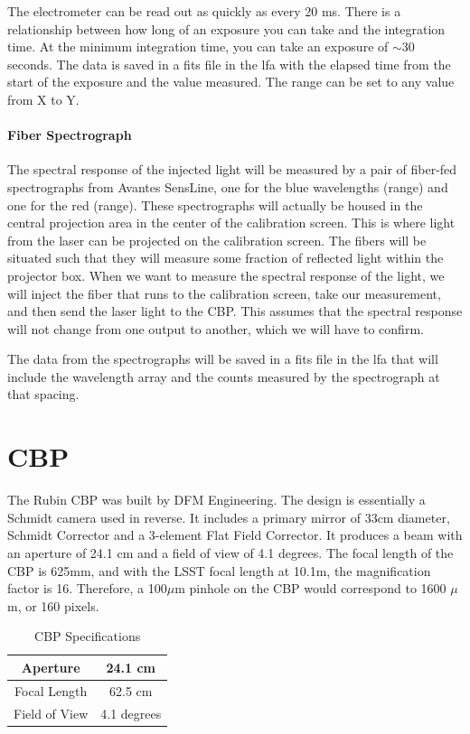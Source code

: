 \documentclass[SE,authoryear,toc]{article}
\begin{document}
\begin{table}[|||]
The electrometer can be read out as quickly as every 20 ms. There is a relationship between how long of an exposure you can take and the integration time. At the minimum integration time, you can take an exposure of $\sim$30 seconds. The data is saved in a fits file in the lfa with the elapsed time from the start of the exposure and the value measured. The range can be set to any value from X to Y. 

\paragraph{\textbf{Fiber Spectrograph}}

The spectral response of the injected light will be measured by a pair of fiber-fed spectrographs from Avantes SensLine, one for the blue wavelengths (range) and one for the red (range). These spectrographs will actually be housed in the central projection area in the center of the calibration screen. This is where light from the laser can be projected on the calibration screen. The fibers will be situated such that they will measure some fraction of reflected light within the projector box. When we want to measure the spectral response of the light, we will inject the fiber that runs to the calibration screen, take our measurement, and then send the laser light to the CBP. This assumes that the spectral response will not change from one output to another, which we will have to confirm.

The data from the spectrographs will be saved in a fits file in the lfa that will include the wavelength array and the counts measured by the spectrograph at that spacing.

\section{CBP}
The Rubin CBP was built by DFM Engineering. 
The design is essentially a Schmidt camera used in reverse. 
It includes a primary mirror of 33cm diameter, Schmidt Corrector and a 3-element Flat Field Corrector. 
It produces a beam with an aperture of 24.1 cm and a field of view of 4.1 degrees. 
The focal length of the CBP is 625mm, and with the LSST focal length at 10.1m, the magnification factor is 16. Therefore, a 100$\mu$m pinhole on the CBP would correspond to 1600 $\mu$m, or 160 pixels. 

\begin{table}[h!]
    \centering
    \begin{tabular}{|c|c|}
      \hline
       Aperture   & 24.1 cm \\
      \hline
      Focal Length   & 62.5 cm \\
      \hline
      Field of View & 4.1 degrees \\
      \hline
    \end{tabular}
    \caption{CBP Specifications}
    \label{tab:my_label}
\end{table}


\end{table}
\end{document}
